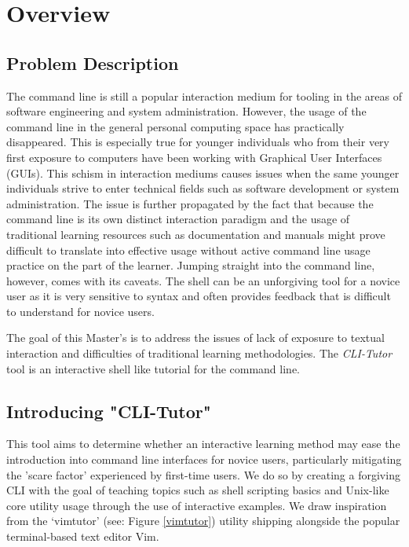\chapter{Overview}
\section{Problem Description}

The command line is still a popular interaction medium for tooling in the areas
of software engineering and system administration. However, the usage of the
command line in the general personal computing space has practically
disappeared. This is especially true for younger individuals who from their
very first exposure to computers have been working with Graphical User
Interfaces (GUIs). This schism in interaction mediums causes issues when the
same younger individuals strive to enter technical fields such as software
development or system administration. The issue is further propagated by the
fact that because the command line is its own distinct interaction paradigm and
the usage of traditional learning resources such as documentation and manuals
might prove difficult to translate into effective usage without active command
line usage practice on the part of the learner. Jumping straight into the
command line, however, comes with its caveats. The shell can be an unforgiving
tool for a novice user as it is very sensitive to syntax and often provides
feedback that is difficult to understand for novice users.

The goal of this Master's is to address the issues of lack of exposure to
textual interaction and difficulties of traditional learning methodologies. The
\textit{CLI-Tutor} tool is an interactive shell like tutorial for the command
line.

%

\section{Introducing "CLI-Tutor"}

This tool aims to determine whether an interactive learning method may ease the
introduction into command line interfaces for novice users, particularly
mitigating the 'scare factor' experienced by first-time users. We do so by
creating a forgiving CLI with the goal of teaching topics such as shell
scripting basics and Unix-like core utility usage through the use of
interactive examples. We draw inspiration from the
`vimtutor'\cite{pierce_ware_smith_moolenaar_2019} (see: Figure \ref{vimtutor})
utility shipping alongside the popular terminal-based text editor Vim. 

